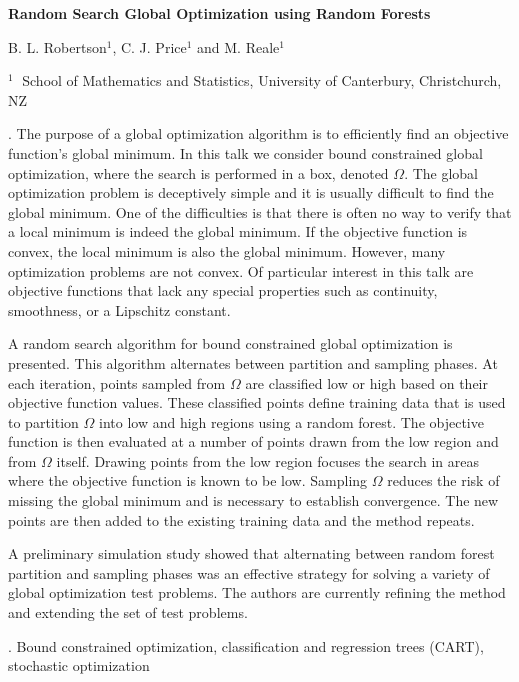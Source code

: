 \documentclass[12pt]{article}
\begin{document}
\begin{flushleft}


{\LARGE\bf Random Search Global Optimization using Random Forests}


\vspace{1.0cm}

B. L. Robertson$^1$, C. J. Price$^1$ and M. Reale$^1$

\begin{description}

\item $^1 \;$ School of Mathematics and Statistics, University of Canterbury,
Christchurch, NZ

\end{description}

\end{flushleft}


\vspace{0.75cm}

. The purpose of a global optimization algorithm is to efficiently find an objective function's global minimum. In this talk we consider bound constrained global optimization, where the search is performed in a box, denoted $\Omega$. The global optimization problem is deceptively simple and it is usually difficult to find the global minimum. One of the difficulties is that there is often no way to verify that a local minimum is indeed the global minimum. If the objective function is convex, the local minimum is also the global minimum. However, many optimization problems are not convex. Of particular interest in this talk are objective functions that lack any special properties such as continuity, smoothness, or a Lipschitz constant.

A random search algorithm for bound constrained global optimization is presented. This algorithm alternates between partition and sampling phases. At each iteration, points sampled from $\Omega$ are classified low or high based on their objective function values. These classified points define training data that is used to partition $\Omega$ into low and high regions using a random forest. The objective function is then evaluated at a number of points drawn from the low region and from $\Omega$ itself. Drawing points from the low region focuses the search in areas where the objective function is known to be low. Sampling $\Omega$ reduces the risk of missing the global minimum and is necessary to establish convergence. The new points are then added to the existing training data and the method repeats.

A preliminary simulation study showed that alternating between random forest partition and sampling phases was an effective strategy for solving a variety of global optimization test problems. The authors are currently refining the method and extending the set of test problems.

\vskip 2mm

.
Bound constrained optimization, classification and regression trees (CART), stochastic optimization
\end{document}
